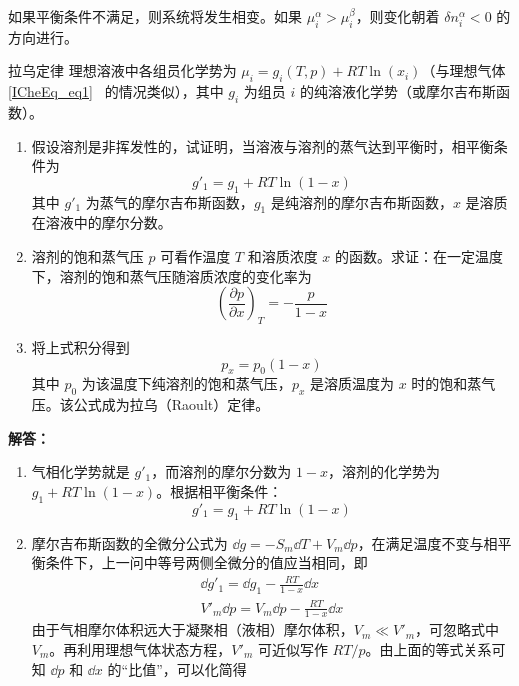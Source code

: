 如果平衡条件不满足，则系统将发生相变。如果 $\mu_i^\alpha>\mu_i^\beta$，则变化朝着 $\delta n_i^\alpha<0$ 的方向进行。

\begin{example}{拉乌定律}
理想溶液中各组员化学势为 $\mu_i=g_i(T,p)+RT\ln(x_i)$（与理想气体 \autoref{ICheEq_eq1}~ 的情况类似），其中 $g_i$ 为组员 $i$ 的纯溶液化学势（或摩尔吉布斯函数）。
\begin{enumerate}
\item 假设溶剂是非挥发性的，试证明，当溶液与溶剂的蒸气达到平衡时，相平衡条件为
\begin{equation}
g'_1=g_1+RT\ln(1-x)
\end{equation}
其中 $g'_1$ 为蒸气的摩尔吉布斯函数，$g_1$ 是纯溶剂的摩尔吉布斯函数，$x$ 是溶质在溶液中的摩尔分数。
\item 溶剂的饱和蒸气压 $p$ 可看作温度 $T$ 和溶质浓度 $x$ 的函数。求证：在一定温度下，溶剂的饱和蒸气压随溶质浓度的变化率为
\begin{equation}
\left(\frac{\partial p}{\partial x}\right)_T=-\frac{p}{1-x}
\end{equation}
\item 将上式积分得到
\begin{equation}
p_x=p_0(1-x)
\end{equation}
其中 $p_0$ 为该温度下纯溶剂的饱和蒸气压，$p_x$ 是溶质温度为 $x$ 时的饱和蒸气压。该公式成为拉乌（Raoult）定律。
\end{enumerate}
\textbf{解答：}
\begin{enumerate}
\item 气相化学势就是 $g'_1$，而溶剂的摩尔分数为 $1-x$，溶剂的化学势为$g_1+RT\ln(1-x)$。根据相平衡条件：
\begin{equation}
g'_1=g_1+RT\ln(1-x)
\end{equation}
\item 摩尔吉布斯函数的全微分公式为 $\dd g=-S_m\dd T+V_m\dd p$，在满足温度不变与相平衡条件下，上一问中等号两侧全微分的值应当相同，即
\begin{equation}
\begin{aligned}
\dd g'_1=\dd g_1-\frac{RT}{1-x}\dd x\\
V'_m\dd p=V_m\dd p-\frac{RT}{1-x}\dd x
\end{aligned}
\end{equation}
由于气相摩尔体积远大于凝聚相（液相）摩尔体积，$V_m\ll V'_m$，可忽略式中 $V_m$。再利用理想气体状态方程，$V'_m$ 可近似写作 $RT/p$。由上面的等式关系可知 $\dd p$ 和 $\dd x$ 的“比值”，可以化简得
\begin{equation}

\end{equation}
\end{enumerate}
\end{example}
